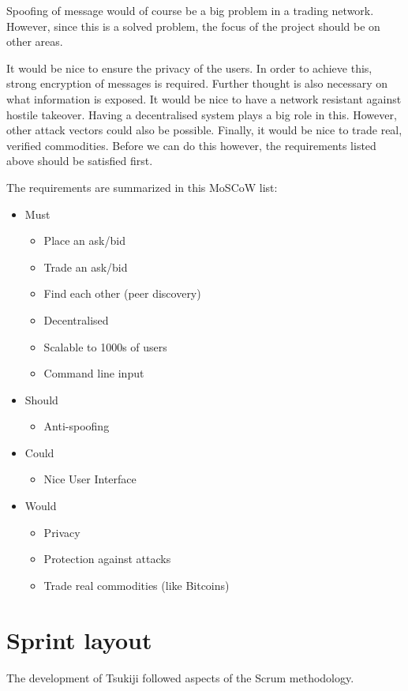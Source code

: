 \documentclass[]{article}
\newenvironment{myitemize}
{ \begin{itemize}
    \setlength{\itemsep}{0pt}
    \setlength{\parskip}{0pt}
    \setlength{\parsep}{0pt}     }
{ \end{itemize}                  }
\begin{document}
Spoofing of message would of course be a big problem in a trading network.
However, since this is a solved problem, the focus of the project should be on other areas.

It would be nice to ensure the privacy of the users.
In order to achieve this, strong encryption of messages is required.
Further thought is also necessary on what information is exposed.
It would be nice to have a network resistant against hostile takeover.
Having a decentralised system plays a big role in this.
However, other attack vectors could also be possible.
Finally, it would be nice to trade real, verified commodities.
Before we can do this however, the requirements listed above should be satisfied first.


The requirements are summarized in this MoSCoW list: \\

\begin{myitemize}
\item Must
\begin{myitemize}
	\item Place an ask/bid
	\item Trade an ask/bid
    \item Find each other (peer discovery)
    \item Decentralised
    \item Scalable to 1000s of users
    \item Command line input
\end{myitemize}
\item Should
\begin{myitemize}
	\item Anti-spoofing
\end{myitemize}
\item Could
\begin{myitemize}
	\item Nice User Interface
\end{myitemize}
\item Would
\begin{myitemize}
	\item Privacy
	\item Protection against attacks
	\item Trade real commodities (like Bitcoins)
\end{myitemize}
\end{myitemize}

\section{Sprint layout}
The development of Tsukiji followed aspects of the Scrum methodology.
\end{document}
